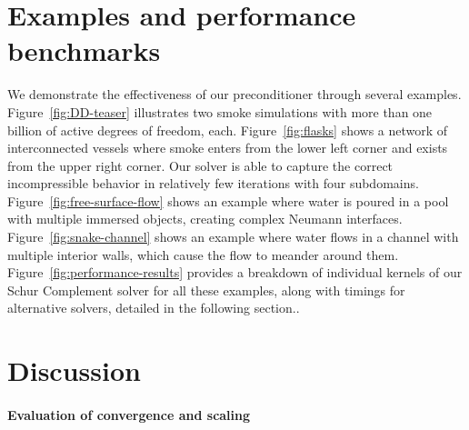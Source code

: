 \section{Examples and performance benchmarks}
\label{sec:results}

We demonstrate the effectiveness of our preconditioner through several examples.
Figure~\ref{fig:DD-teaser} illustrates two smoke simulations with more than one billion of active degrees of freedom, each. 
Figure~\ref{fig:flasks} shows a network of interconnected vessels where smoke enters from the lower
left corner and exists from the upper right corner. Our solver is able to
capture the correct incompressible behavior in relatively few iterations with
four subdomains.  Figure~\ref{fig:free-surface-flow} shows an example where
water is poured in a pool with multiple immersed objects, creating complex
Neumann interfaces. Figure~\ref{fig:snake-channel} shows an example where water flows in
a channel with multiple interior walls, which cause the flow to meander around
them. Figure~\ref{fig:performance-results} provides a breakdown of individual kernels of our Schur Complement solver for all these examples, along with timings for alternative
solvers, detailed in the following section..


\section{Discussion}
\label{sec:discussion}

\paragraph{Evaluation of convergence and scaling}

